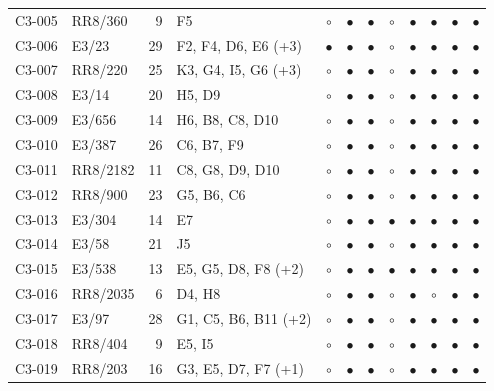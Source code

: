 {\begin{longtable}{llrp{3.9cm}cccccccc}
    C3-005 & RR8/360 & 9 & F5 & $\circ$ & $\bullet$ & $\bullet$ & $\circ$ & $\bullet$ & $\bullet$ & $\bullet$ & $\bullet$ \\
    C3-006 & E3/23 & 29 & F2, F4, D6, E6 (+3) & $\bullet$ & $\bullet$ & $\bullet$ & $\circ$ & $\bullet$ & $\bullet$ & $\bullet$ & $\bullet$ \\
    C3-007 & RR8/220 & 25 & K3, G4, I5, G6 (+3) & $\circ$ & $\bullet$ & $\bullet$ & $\circ$ & $\bullet$ & $\bullet$ & $\bullet$ & $\bullet$ \\
    C3-008 & E3/14 & 20 & H5, D9 & $\circ$ & $\bullet$ & $\bullet$ & $\circ$ & $\bullet$ & $\bullet$ & $\bullet$ & $\bullet$ \\
    C3-009 & E3/656 & 14 & H6, B8, C8, D10 & $\circ$ & $\bullet$ & $\bullet$ & $\circ$ & $\bullet$ & $\bullet$ & $\bullet$ & $\bullet$ \\
    C3-010 & E3/387 & 26 & C6, B7, F9 & $\circ$ & $\bullet$ & $\bullet$ & $\circ$ & $\bullet$ & $\bullet$ & $\bullet$ & $\bullet$ \\
    C3-011 & RR8/2182 & 11 & C8, G8, D9, D10 & $\circ$ & $\bullet$ & $\bullet$ & $\circ$ & $\bullet$ & $\bullet$ & $\bullet$ & $\bullet$ \\
    C3-012 & RR8/900 & 23 & G5, B6, C6 & $\circ$ & $\bullet$ & $\bullet$ & $\circ$ & $\bullet$ & $\bullet$ & $\bullet$ & $\bullet$ \\
    C3-013 & E3/304 & 14 & E7 & $\circ$ & $\bullet$ & $\bullet$ & $\bullet$ & $\bullet$ & $\bullet$ & $\bullet$ & $\bullet$ \\
    C3-014 & E3/58 & 21 & J5 & $\circ$ & $\bullet$ & $\bullet$ & $\circ$ & $\bullet$ & $\bullet$ & $\bullet$ & $\bullet$ \\
    C3-015 & E3/538 & 13 & E5, G5, D8, F8 (+2) & $\circ$ & $\bullet$ & $\bullet$ & $\bullet$ & $\bullet$ & $\bullet$ & $\bullet$ & $\bullet$ \\
    C3-016 & RR8/2035 & 6 & D4, H8 & $\circ$ & $\bullet$ & $\bullet$ & $\circ$ & $\bullet$ & $\circ$ & $\bullet$ & $\bullet$ \\
    C3-017 & E3/97 & 28 & G1, C5, B6, B11 (+2) & $\circ$ & $\bullet$ & $\bullet$ & $\circ$ & $\bullet$ & $\bullet$ & $\bullet$ & $\bullet$ \\
    C3-018 & RR8/404 & 9 & E5, I5 & $\circ$ & $\bullet$ & $\bullet$ & $\circ$ & $\bullet$ & $\bullet$ & $\bullet$ & $\bullet$ \\
    C3-019 & RR8/203 & 16 & G3, E5, D7, F7 (+1) & $\circ$ & $\bullet$ & $\bullet$ & $\circ$ & $\bullet$ & $\bullet$ & $\bullet$ & $\bullet$ \\

\end{longtable}}
